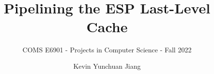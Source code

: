 \documentclass{sig-alternate}
\begin{document}
\title{\Large\bf Pipelining the ESP Last-Level Cache}
\subtitle{\normalsize COMS E6901 - Projects in Computer Science - Fall 2022}

\author{
\alignauthor
Kevin Yunchuan Jiang\\
\vspace{0.2cm}
}

\vspace{-2cm}

\maketitle

\vspace{-2cm}



\end{document}
